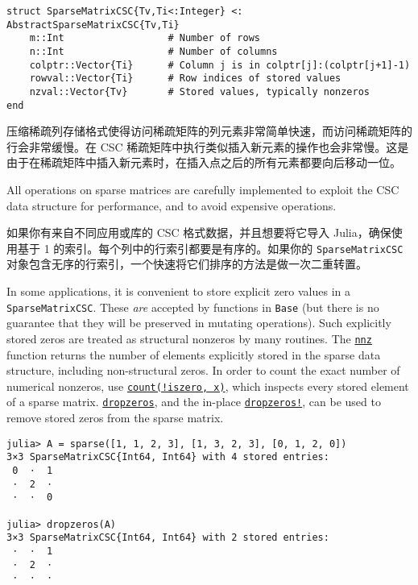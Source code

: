 \begin{verbatim}
struct SparseMatrixCSC{Tv,Ti<:Integer} <: AbstractSparseMatrixCSC{Tv,Ti}
    m::Int                  # Number of rows
    n::Int                  # Number of columns
    colptr::Vector{Ti}      # Column j is in colptr[j]:(colptr[j+1]-1)
    rowval::Vector{Ti}      # Row indices of stored values
    nzval::Vector{Tv}       # Stored values, typically nonzeros
end
\end{verbatim}



压缩稀疏列存储格式使得访问稀疏矩阵的列元素非常简单快速，而访问稀疏矩阵的行会非常缓慢。在 CSC 稀疏矩阵中执行类似插入新元素的操作也会非常慢。这是由于在稀疏矩阵中插入新元素时，在插入点之后的所有元素都要向后移动一位。



All operations on sparse matrices are carefully implemented to exploit the CSC data structure for performance, and to avoid expensive operations.



如果你有来自不同应用或库的 CSC 格式数据，并且想要将它导入 Julia，确保使用基于 1 的索引。每个列中的行索引都要是有序的。如果你的 \texttt{SparseMatrixCSC} 对象包含无序的行索引，一个快速将它们排序的方法是做一次二重转置。



In some applications, it is convenient to store explicit zero values in a \texttt{SparseMatrixCSC}. These \emph{are} accepted by functions in \texttt{Base} (but there is no guarantee that they will be preserved in mutating operations). Such explicitly stored zeros are treated as structural nonzeros by many routines. The \hyperlink{4231069364201374387}{\texttt{nnz}} function returns the number of elements explicitly stored in the sparse data structure, including non-structural zeros. In order to count the exact number of numerical nonzeros, use \hyperlink{4123799324867706690}{\texttt{count(!iszero, x)}}, which inspects every stored element of a sparse matrix. \hyperlink{10222793754853330762}{\texttt{dropzeros}}, and the in-place \hyperlink{13132808383029320263}{\texttt{dropzeros!}}, can be used to remove stored zeros from the sparse matrix.




\begin{verbatim}
julia> A = sparse([1, 1, 2, 3], [1, 3, 2, 3], [0, 1, 2, 0])
3×3 SparseMatrixCSC{Int64, Int64} with 4 stored entries:
 0  ⋅  1
 ⋅  2  ⋅
 ⋅  ⋅  0

julia> dropzeros(A)
3×3 SparseMatrixCSC{Int64, Int64} with 2 stored entries:
 ⋅  ⋅  1
 ⋅  2  ⋅
 ⋅  ⋅  ⋅
\end{verbatim}



